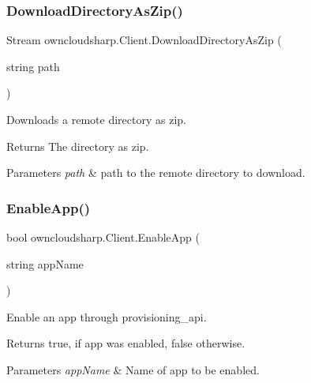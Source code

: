 \subsubsection{\texorpdfstring{Download\+Directory\+As\+Zip()}{DownloadDirectoryAsZip()}}
{\footnotesize\ttfamily Stream owncloudsharp.\+Client.\+Download\+Directory\+As\+Zip (\begin{DoxyParamCaption}\item[{string}]{path }\end{DoxyParamCaption})}



Downloads a remote directory as zip. 

\begin{DoxyReturn}{Returns}
The directory as zip.
\end{DoxyReturn}

\begin{DoxyParams}{Parameters}
{\em path} & path to the remote directory to download.\\
\hline
\end{DoxyParams}
\mbox{\label{classowncloudsharp_1_1_client_a4023a60f6fa18288d4b9cf8cba705e7c}} 
\subsubsection{\texorpdfstring{Enable\+App()}{EnableApp()}}
{\footnotesize\ttfamily bool owncloudsharp.\+Client.\+Enable\+App (\begin{DoxyParamCaption}\item[{string}]{app\+Name }\end{DoxyParamCaption})}



Enable an app through provisioning\+\_\+api. 

\begin{DoxyReturn}{Returns}
{\ttfamily true}, if app was enabled, {\ttfamily false} otherwise.
\end{DoxyReturn}

\begin{DoxyParams}{Parameters}
{\em app\+Name} & Name of app to be enabled.\\
\hline
\end{DoxyParams}
\mbox{\label{classowncloudsharp_1_1_client_a6f2160610e85aa278d235be8ba613bbd}} 
